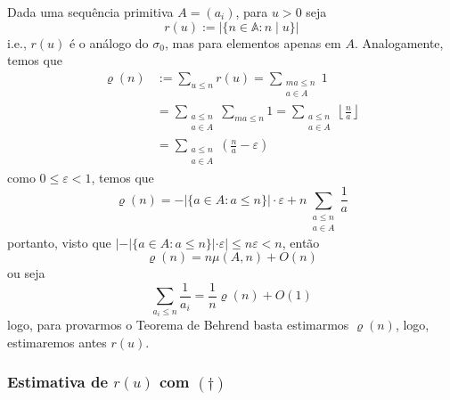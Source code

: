 \documentclass[11pt]{article}
\newcommand{\mbb}[1]{\mathbb{#1}}
\newcommand{\rp}[1]{{\left(#1\right)}}
\newcommand\floor[1]{{\left\lfloor#1\right\rfloor}}
\begin{document}
Dada uma sequência primitiva $A=(a_i)$, para $u>0$ seja
$$r(u):=|\{n\in\mbb{A}:n\mid u\}|$$
i.e., $r(u)$ é o análogo do $\sigma_0$, mas para elementos apenas em $A$. Analogamente, temos que
\begin{align*}
    \varrho(n) & := \sum_{u\leq n}r(u) = \sum_{\substack{ma\leq n\\ a\in A}}1\\
    & =  \sum_{\substack{a\leq n\\ a\in A}}\sum_{ma\leq n}1 = \sum_{\substack{a\leq n\\ a\in A}}\floor{\frac{n}{a}}\\
    & = \sum_{\substack{a\leq n\\ a\in A}}\rp{\frac{n}{a}-\varepsilon}
\end{align*}
como $0\leq\varepsilon<1$, temos que
$$\varrho(n)=-|\{a\in A:a\leq n\}|\cdot\varepsilon+n\sum_{\substack{a\leq n\\ a\in A}}\frac1a$$
portanto, visto que $|-|\{a\in A:a\leq n\}|\cdot\varepsilon|\leq n\varepsilon < n$, então
$$\varrho(n)=n\mu(A,n)+O(n)$$
ou seja
$$\sum_{a_i\leq n}\frac{1}{a_i}=\frac{1}{n}\varrho(n)+O(1)$$
logo, para provarmos o Teorema de Behrend basta estimarmos $\varrho(n)$, logo, estimaremos antes $r(u)$.

\subsubsection{Estimativa de $r(u)$ com $(\dagger)$}
\end{document}
